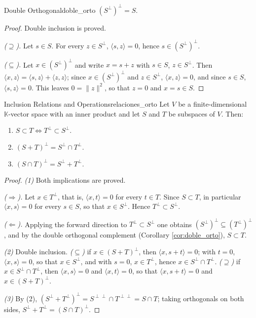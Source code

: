 \documentclass[11pt, a4paper]{article}
\begin{document}
\begin{corolario}{Double Orthogonal}{doble_orto}
$(S^\perp)^\perp = S$.
\end{corolario}

\begin{proof}
Double inclusion is proved.

\textit{($\supseteq$).} Let $s \in S$. For every $z \in S^\perp$, $\langle s, z \rangle = 0$, hence $s \in (S^\perp)^\perp$.

\textit{($\subseteq$).} Let $x \in (S^\perp)^\perp$ and write $x = s + z$ with $s \in S$, $z \in S^\perp$. Then $\langle x, z \rangle = \langle s, z \rangle + \langle z, z \rangle$; since $x \in (S^\perp)^\perp$ and $z \in S^\perp$, $\langle x, z \rangle = 0$, and since $s \in S$, $\langle s, z \rangle = 0$. This leaves $0 = \|z\|^2$, so that $z = 0$ and $x = s \in S$.
\end{proof}

\begin{proposicion}{Inclusion Relations and Operations}{relaciones_orto}
Let $V$ be a finite-dimensional $\mathbb{K}$-vector space with an inner product and let $S$ and $T$ be subspaces of $V$. Then:
\begin{enumerate}
    \item $S \subset T \iff T^\perp \subset S^\perp$.
    \item $(S+T)^\perp = S^\perp \cap T^\perp$.
    \item $(S \cap T)^\perp = S^\perp + T^\perp$.
\end{enumerate}
\end{proposicion}

\begin{proof}
\textit{(1)} Both implications are proved.

\textit{($\Rightarrow$).} Let $x \in T^\perp$, that is, $\langle x, t \rangle = 0$ for every $t \in T$. Since $S \subset T$, in particular $\langle x, s \rangle = 0$ for every $s \in S$, so that $x \in S^\perp$. Hence $T^\perp \subset S^\perp$.

\textit{($\Leftarrow$).} Applying the forward direction to $T^\perp \subset S^\perp$ one obtains $(S^\perp)^\perp \subseteq (T^\perp)^\perp$, and by the double orthogonal complement (Corollary \ref{cor:doble_orto}), $S \subset T$.

\textit{(2)} Double inclusion. \textit{($\subseteq$)} if $x \in (S+T)^\perp$, then $\langle x, s+t \rangle = 0$; with $t=0$, $\langle x, s \rangle = 0$, so that $x \in S^\perp$, and with $s=0$, $x \in T^\perp$, hence $x \in S^\perp \cap T^\perp$. \textit{($\supseteq$)} if $x \in S^\perp \cap T^\perp$, then $\langle x, s \rangle = 0$ and $\langle x, t \rangle = 0$, so that $\langle x, s+t \rangle = 0$ and $x \in (S+T)^\perp$.

\textit{(3)} By (2), $(S^\perp + T^\perp)^\perp = S^{\perp\perp} \cap T^{\perp\perp} = S \cap T$; taking orthogonals on both sides, $S^\perp + T^\perp = (S \cap T)^\perp$.
\end{proof}
\end{document}
